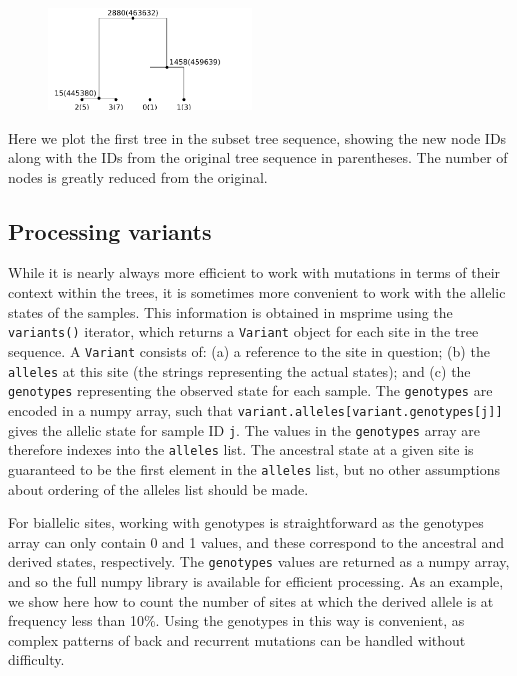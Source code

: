 \documentclass[graybox]{svmult}
\newcommand{\includenbimage}[1]{\begin{center}\texttt{[image: \#1]}\end{center}}
\begin{document}
\begin{figure}
  \begin{center}
    \includegraphics[width=0.48\textwidth]{images/processing-results_15_0.pdf}
  \end{center}
\end{figure}
Here we plot the first tree in the subset tree sequence, showing the new
node IDs along with the IDs from the original tree sequence in
parentheses. The number of nodes is greatly reduced from the original.

\subsection{Processing variants}\label{processing-variants}

While it is nearly always more efficient to work with mutations in terms
of their context within the trees, it is sometimes more convenient to
work with the allelic states of the samples. This information is
obtained in msprime using the \texttt{variants()} iterator, which
returns a \texttt{Variant} object for each site in the tree sequence. A
\texttt{Variant} consists of: (a) a reference to the site in question;
(b) the \texttt{alleles} at this site (the strings representing the
actual states); and (c) the \texttt{genotypes} representing the observed
state for each sample. The \texttt{genotypes} are encoded in a numpy
array, such that \texttt{variant.alleles{[}variant.genotypes{[}j{]}{]}}
gives the allelic state for sample ID \texttt{j}. The values in the
\texttt{genotypes} array are therefore indexes into the \texttt{alleles}
list. The ancestral state at a given site is guaranteed to be the first
element in the \texttt{alleles} list, but no other assumptions about
ordering of the alleles list should be made.

For biallelic sites, working with genotypes is straightforward as the
genotypes array can only contain 0 and 1 values, and these correspond to
the ancestral and derived states, respectively. The \texttt{genotypes}
values are returned as a numpy array, and so the full numpy library is
available for efficient processing. As an example, we show here how to
count the number of sites at which the derived allele is at frequency
less than 10\%. Using the genotypes in this way is convenient, as
complex patterns of back and recurrent mutations can be handled without
difficulty.
\end{document}
